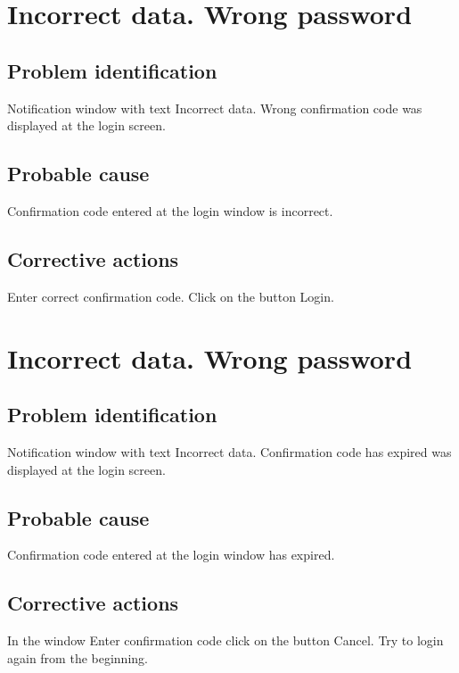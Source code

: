 \section{Incorrect data. Wrong password}

\subsection{Problem identification}
Notification window with text Incorrect data. Wrong confirmation code
was displayed at the login screen.

\subsection{Probable cause}
Confirmation code entered at the login window is incorrect.

\subsection{Corrective actions}
Enter correct confirmation code. Click on the button Login.


\section{Incorrect data. Wrong password}

\subsection{Problem identification}
Notification window with text Incorrect data. Confirmation code has
expired was displayed at the login screen.

\subsection{Probable cause}
Confirmation code entered at the login window has expired.

\subsection{Corrective actions}
In the window Enter confirmation code click on the button Cancel. 
Try to login again from the beginning.
